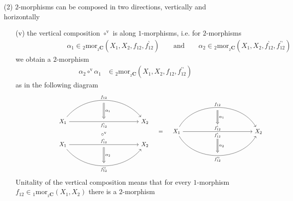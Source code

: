 \begin{enumerate}
\begin{enumerate}
\item[(2)]
$2$-morphisms can be composed in two directions, vertically and horizontally
\begin{enumerate}
\item[(v)]
the vertical composition $\circ^{\mathrm{v}}$ is along $1$-morphisms, i.e. for $2$-morphisms
\begin{align*}
\hspace{7em}
  \alpha_{1}
  \in
  {_{2}}\mathrm{mor}_{{_{2}\mathbf{C}}}
  \left(
    X_{1}
    ,
    X_{2}
    ,
    f_{12}
    ,
    f_{12}^{\backprime}
  \right)
  \qquad
  \text{and}
  \qquad
  \alpha_{2} \in {_{2}}\mathrm{mor}_{{_{2}\mathbf{C}}}
  \left(
    X_{1}
    ,
    X_{2}
    ,
    f_{12}^{\backprime}
    ,
    f_{12}^{\backprime\backprime}
  \right)
\end{align*}
we obtain a $2$-morphism
\begin{align*}
\hspace{2em}
  \alpha_{2}
  \circ^{\mathrm{v}}
  \alpha_{1}
  &\in
  {_{2}}\mathrm{mor}_{{_{2}\mathbf{C}}}
  \left(
    X_{1}
    ,
    X_{2}
    ,
    f_{12}
    ,
    f_{12}^{\backprime\backprime}
  \right)
\end{align*}
as in the following diagram
\begin{equation*}
\hspace{7em}
\begin{tikzcd}[row sep=2.4em,column sep=12em]
  X_{1}
  \ar[bend left=50]{r}[swap,name=U1]{}{f_{12}}
  \ar{r}[name=D1]{}[swap]{f_{12}^{\backprime}}[swap,below=5.5mm,font=\normalsize]{\circ^{\mathrm{v}}}
  &
  X_{2}
  \ar[Rightarrow,from=U1,to=D1,"\alpha_{1}"]
  \\
  X_{1}
  \ar{r}[swap,name=U2]{}{f_{12}^{\backprime}}
  \ar[bend right=50]{r}[name=D2]{}[swap]{f_{12}^{\backprime\backprime}}
  &
  X_{2}
  \ar[Rightarrow,from=U2,to=D2,"\alpha_{2}"]
\end{tikzcd}
  \quad
  =
  \quad
\begin{tikzcd}[row sep=2.4em,column sep=12em]
  X_{1}
  \ar[bend left=60]{r}[swap,name=U]{}{f_{12}}
  \ar{r}[name=M1]{f_{12}^{\backprime}}[swap,name=M2]{f_{12}^{\backprime}}
  \ar[bend right=60]{r}[name=D]{}[swap]{f_{12}^{\backprime\backprime}}
  &
  X_{2}
  \ar[Rightarrow,from=U,to=M1,"\alpha_{1}"]
  \ar[Rightarrow,from=M2,to=D,"\alpha_{2}"]
\end{tikzcd}
\end{equation*}
Unitality of the vertical composition means that for every $1$-morphism $f_{12} \in {_{1}}\mathrm{mor}_{{_{2}\mathbf{C}}}(X_{1},X_{2})$ there is a $2$-morphism 

\end{enumerate}
\end{enumerate}
\end{enumerate}
